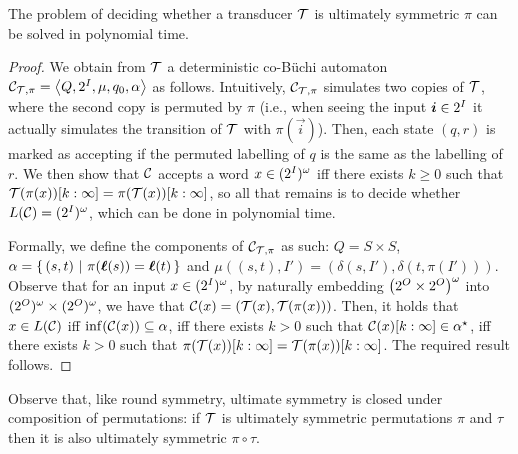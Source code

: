 \begin{theorem}
	The problem of deciding whether a transducer $\mathcal{T}$ is ultimately symmetric \WRT $\pi$ can be solved in polynomial time.
\end{theorem}
\begin{proof}
	We obtain from $\mathcal{T}$ a deterministic co-B\"uchi automaton $\mathcal{C}_{\mathcal{T},\pi}=\left< Q,2^{I},\mu,q_0,\alpha\right>$ as follows. Intuitively, $\mathcal{C}_{\mathcal{T},\pi}$ simulates two copies of $\mathcal{T}$, where the second copy is permuted by $\pi$ (i.e., when seeing the input $\boldsymbol{i}\in 2^{I}$ it actually simulates the transition of $\mathcal{T}$ with $\pi(\vec{i})$). Then, each state $(q,r)$ is marked as accepting if the permuted labelling of $q$ is the same as the labelling of $r$. 
	We then show that $\mathcal{C}$ accepts a word $x\in (2^{I})^\omega$ iff there exists $k\ge 0$ such that $\mathcal{T}(\pi(x))[k:\infty]=\pi(\mathcal{T}(x))[k:\infty]$, so all that remains is to decide whether $L(\mathcal{C})=(2^{I})^\omega$, which can be done in polynomial time.
	
	Formally, we define the components of $\mathcal{C}_{\mathcal{T}, \pi}$ as such: $Q=S\times S$, $\alpha=\left\{\,(s,t)\ \middle|\ \pi(\boldsymbol{\ell}(s))=\boldsymbol{\ell}(t)\,\right\}$ and $\mu\left((s,t),I'\right)=\left( \delta(s,I'), \delta(t, \pi(I')) \right)$. Observe that for an input $x\in (2^{I})^\omega$, by naturally embedding $\left(2^{O} \times 2^{O}\right)^\omega$ into $(2^{O})^\omega\times (2^{O})^\omega$, we have that $\mathcal{C}(x)=\left(\mathcal{T}(x), \mathcal{T}(\pi(x))\right)$.
	Then, it holds that $x\in L(\mathcal{C})$ iff $\inf(\mathcal{C}(x))\subseteq \alpha$, iff there exists $k>0$ such that $\mathcal{C}(x)[k:\infty]\in \alpha^\star$, iff there exists $k>0$ such that $\pi(\mathcal{T}(x))[k:\infty]=\mathcal{T}(\pi(x))[k:\infty]$. The required result follows.
\end{proof}

Observe that, like round symmetry, ultimate symmetry is closed under composition of permutations: if $\mathcal{T}$ is ultimately symmetric \WRT permutations $\pi$ and $\tau$ then it is also ultimately symmetric \WRT $\pi\circ\tau$.
